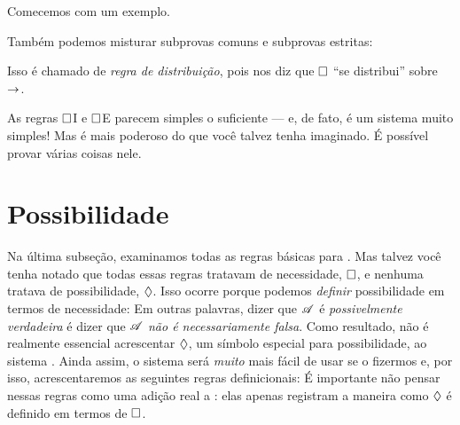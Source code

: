 Comecemos com um exemplo.
\begin{fitchproof}
		\PR
		\PR
		\open
		\AS
		\close
\end{fitchproof}
Também podemos misturar subprovas comuns e subprovas estritas:
\begin{fitchproof}
		\PR
		\open
		\AS
		\open
		\AS
		\close
		\close
		 
\end{fitchproof}
Isso é chamado de \emph{regra de distribuição}, pois nos diz que $\Box$ \textquotedblleft se distribui\textquotedblright{} sobre $\rightarrow$.

As regras $\Box$I e $\Box$E parecem simples o suficiente — e, de fato, \mlK{} é um sistema muito simples! Mas \mlK{} é mais poderoso do que você talvez tenha imaginado. É possível provar várias coisas nele.

\section{Possibilidade}
\label{possibility}

Na última subseção, examinamos todas as regras básicas para \mlK. Mas talvez você tenha notado que todas essas regras tratavam de necessidade, $\Box$, e nenhuma tratava de possibilidade, $\Diamond$. Isso ocorre porque podemos \emph{definir} possibilidade em termos de necessidade:
Em outras palavras, dizer que $\mathscr{A}$ é \emph{possivelmente verdadeira} é dizer que $\mathscr{A}$ \emph{não é necessariamente falsa}. Como resultado, não é realmente essencial acrescentar $\Diamond$, um símbolo especial para possibilidade, ao sistema \mlK. Ainda assim, o sistema será \emph{muito} mais fácil de usar se o fizermos e, por isso, acrescentaremos as seguintes regras definicionais:
É importante não pensar nessas regras como uma adição real a \mlK: elas apenas registram a maneira como $\Diamond$ é definido em termos de $\Box$.

